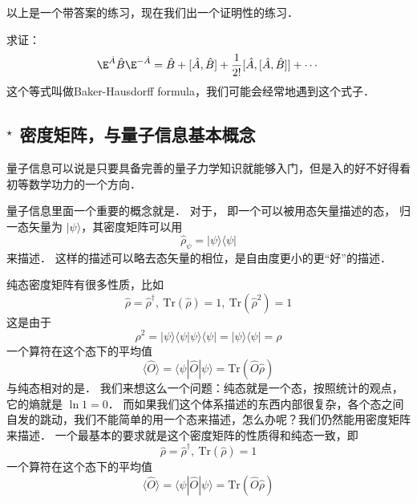 以上是一个带答案的练习，现在我们出一个证明性的练习．

\begin{exer}{}
求证：
\begin{equation}
\E^{\hat A}\hat B \E^{-\hat A} = \hat{B} + [\hat A,\hat B] + \frac{1}{2!} [\hat A, [\hat A,\hat B]] + \cdots
\end{equation}
这个等式叫做Baker-Hausdorff formula，我们可能会经常地遇到这个式子．
\end{exer}

\subsection{$^\star$ 密度矩阵，与量子信息基本概念}

量子信息可以说是只要具备完善的量子力学知识就能够入门，但是入的好不好得看初等数学功力的一个方向．

量子信息里面一个重要的概念就是． 对于， 即一个可以被用态矢量描述的态， 归一态矢量为 $|\psi\rangle$，其密度矩阵可以用
\begin{equation}
\hat\rho_{\psi} = |\psi\rangle\langle\psi|
\end{equation}
来描述． 这样的描述可以略去态矢量的相位，是自由度更小的更“好”的描述．

纯态密度矩阵有很多性质，比如
\begin{equation}
\hat\rho = \hat\rho^{\dagger},\ \text{Tr}(\hat\rho) = 1,\ \text{Tr}(\hat\rho^2) = 1
\end{equation}
这是由于
\begin{equation}
\rho^2 = |\psi\rangle\langle\psi|\psi\rangle\langle\psi| = |\psi\rangle\langle\psi| = \rho
\end{equation}
一个算符在这个态下的平均值
\begin{equation}
\langle\hat O\rangle = \langle\psi|\hat O|\psi\rangle = \text{Tr}(\hat O\hat \rho)
\end{equation}
与纯态相对的是． 我们来想这么一个问题：纯态就是一个态，按照统计的观点，它的熵就是 $\ln 1 = 0$． 而如果我们这个体系描述的东西内部很复杂，各个态之间自发的跳动，我们不能简单的用一个态来描述，怎么办呢？我们仍然能用密度矩阵来描述． 一个最基本的要求就是这个密度矩阵的性质得和纯态一致，即
\begin{equation}
\hat\rho = \hat\rho^{\dagger},\ \text{Tr}(\hat\rho) = 1
\end{equation}
一个算符在这个态下的平均值
\begin{equation}
\langle\hat O\rangle = \langle\psi|\hat O|\psi\rangle = \text{Tr}(\hat O\hat \rho)
\end{equation}

